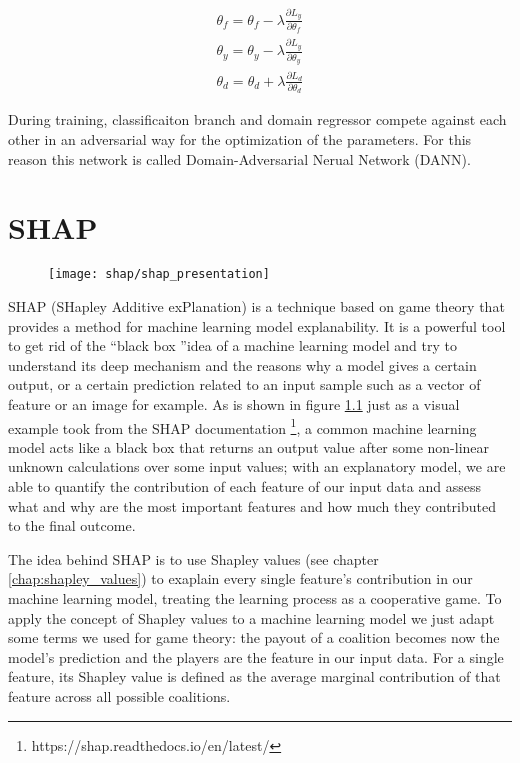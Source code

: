 \documentclass[10pt]{report}
\begin{document}
\begin{equation}
\begin{split}
 \theta_f = \theta_f - \lambda \frac{\partial L_y}{\partial \theta_f} \\
 \theta_y = \theta_y - \lambda \frac{\partial L_y}{\partial \theta_y} \\
\theta_d = \theta_d + \lambda \frac{\partial L_d}{\partial \theta_d}
\end{split}
\end{equation}

During training, classificaiton branch and domain regressor compete against each other in an adversarial way for the optimization of the parameters. For this reason this network is called Domain-Adversarial Nerual Network (DANN).



\chapter{SHAP}\label{sec:shap}


\begin{figure}[h]
\centering
\texttt{[image: shap/shap\_presentation]}
\caption{}\label{fig:shap_waterfall_example}
\end{figure}


SHAP (SHapley Additive exPlanation) is a technique based on game theory that provides a method for machine learning model explanability.
It is a powerful tool to get rid of the \textquotedblleft black box \textquotedblright idea of a machine learning model and try to understand its deep mechanism and the reasons why a model gives a certain output, or a certain prediction related to an input sample such as a vector of feature or an image for example.
As is shown in figure \ref{fig:shap_waterfall_example} just as a visual example took from the SHAP documentation \footnote{https://shap.readthedocs.io/en/latest/}, a common machine learning model acts like a black box that returns an output value after some non-linear unknown calculations over some input values; with an explanatory model, we are able to quantify the contribution of each feature of our input data and assess what and why are the most important features and how much they contributed to the final outcome.

The idea behind SHAP is to use Shapley values (see chapter \ref{chap:shapley_values}) to exaplain every single feature's contribution in our machine learning model, treating the learning process as a cooperative game.
To apply the concept of Shapley values to a machine learning model we just adapt some terms we used for game theory: the payout of a coalition becomes now the model's prediction and the players are the feature in our input data.
For a single feature, its Shapley value is defined as the average marginal contribution of that feature across all possible coalitions.
\end{document}
